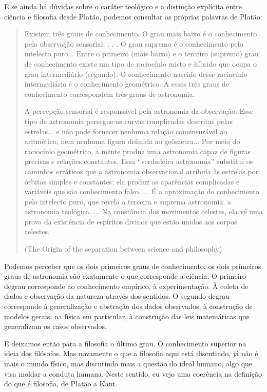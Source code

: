 E se ainda há dúvidas sobre o caráter teológico e a distinção explícita entre ciência e filosofia desde Platão, podemos consultar as próprias palavras de Platão:

\begin{quote}
Existem três graus de conhecimento. O grau mais baixo é o conhecimento pela observação sensorial. . . . O grau supremo é o conhecimento pelo intelecto puro... Entre o primeiro (mais baixo) e o terceiro (supremo) grau de conhecimento existe um tipo de raciocínio misto e híbrido que ocupa o grau intermediário (segundo). O conhecimento nascido desse raciocínio intermediário é o conhecimento geométrico. A esses três graus de conhecimento correspondem três graus de astronomia.

A percepção sensorial é responsável pela astronomia da observação. Esse tipo de astronomia persegue as curvas complicadas descritas pelas estrelas... e não pode fornecer nenhuma relação comensurável ao aritmético, nem nenhuma figura definida ao geômetra... Por meio do raciocínio geométrico, a mente produz uma astronomia capaz de figuras precisas e relações constantes. Essa “verdadeira astronomia” substitui os caminhos erráticos que a astronomia observacional atribuía às estrelas por órbitas simples e constantes; ela produz as aparências complicadas e variáveis que são conhecimento falso. ... É a aproximação do conhecimento pelo intelecto puro, que revela a terceira e suprema astronomia, a astronomia teológica. ... Na constância dos movimentos celestes, ela vê uma prova da existência de espíritos divinos que estão unidos aos corpos celestes.

(The Origin of the separation between science and philosophy)
\end{quote}

Podemos perceber que os dois primeiros graus de conhecimento, os dois primeiros graus de astronomia são exatamente o que corresponde a ciência. O primeiro degrau corresponde ao conhecimento empírico, à experimentação. À coleta de dados e observação da natureza através dos sentidos. O segundo degrau corresponde à generalização e abstração dos dados observados, à construção de modelos gerais, na física em particular, à construção das leis matemáticas que generalizam os casos observados.

E deixamos então para a filosofia o último grau. O conhecimento superior na ideia dos filósofos. Mas novamente o que a filosofia aqui está discutindo, já não é mais o mundo físico, mas discutindo mais a questão do ideal humano, algo que visa moldar a conduta humana. Neste sentido, eu vejo uma coerência na definição do que é filosofia, de Platão a Kant. 

